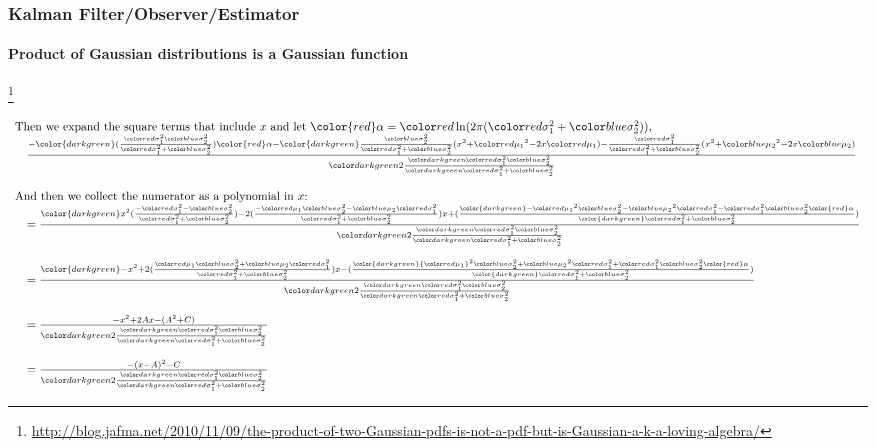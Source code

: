 \documentclass{beamer}
\newenvironment{changemargin}[2]
	{
	  	\begin{list}{}
		{
			\setlength{\topsep}{0pt}%
			\setlength{\leftmargin}{#1}%
			\setlength{\rightmargin}{#2}%
			\setlength{\listparindent}{\parindent}%
			\setlength{\itemindent}{\parindent}%
			\setlength{\parsep}{\parskip}%
		}
	  	\item[]
		}
		{\end{list}
	}
\begin{document}
\begin{frame}[plain]
\frametitle{Kalman Filter/Observer/Estimator}
\framesubtitle{Product of Gaussian distributions is a Gaussian function}

\footnote{\tiny\hspace{-0.23in} \hspace{-0.25in}
\href{http://blog.jafma.net/2010/11/09/the-product-of-two-Gaussian-pdfs-is-not-a-pdf-but-is-Gaussian-a-k-a-loving-algebra/}{http://blog.jafma.net/2010/11/09/the-product-of-two-Gaussian-pdfs-is-not-a-pdf-but-is-Gaussian-a-k-a-loving-algebra/}}
\begin{changemargin}{-1.5in}{0in}
\scriptsize

\begin{equation*}
\begin{array}{llllllll}
\multicolumn{2}{l}{\textrm{Then we expand the square terms that include $x$ and let ${\color{red}\alpha}=\myalpha$,}}\\ 

&\frac        {             - {\color{darkgreen}( \frac { \varone \vartwo }{\varone + \vartwo})} {\color{red}\alpha}              - {\color{darkgreen}\frac { \vartwo }{\varone + \vartwo} (x^2+\muone^2-2x\muone) - \frac{ \varone }{\varone + \vartwo} (x^2+\mutwo^2-2x\mutwo)  }        }          { \divvarprodvarsum}\\\\

\multicolumn{2}{l}{\textrm{And then we collect the numerator as a polynomial in $x$:}}\\ 

&=\frac        {            {\color{darkgreen}x^2 ( \frac {- \varone - \vartwo }{ \varone + \vartwo } )            - 2 ( \frac {- \muone \vartwo - \mutwo \varone }{ \varone + \vartwo} )x            +} ( \frac { {\color{darkgreen}- {\muone}^2 \vartwo - {\mutwo}^2 \varone - \varone \vartwo} {\color{red}\alpha}}{\color{darkgreen} \varone + \vartwo } )         }         {\divvarprodvarsum}\\\\

&=\frac        {       {\color{darkgreen}- x^2            + 2 ( \frac { \muone \vartwo + \mutwo \varone }{ \varone + \vartwo} )x            -} ( \frac {  {\color{darkgreen}{\muone}^2 \vartwo + {\mutwo}^2 \varone + \varone \vartwo} {\color{red}\alpha} }{\color{darkgreen} \varone + \vartwo } )         }         {\divvarprodvarsum}\\\\
&=\frac{-x^2+2Ax-(A^2+C)}{ \divvarprodvarsum}\\\\
&=\frac{-(x-A)^2-C}{ \divvarprodvarsum}\\
\end{array}
\end{equation*}
\end{changemargin}
\end{frame}
\end{document}
